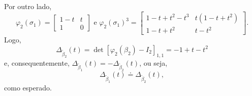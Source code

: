 	Por outro lado,
	\begin{equation*}
    	\varphi_2(\sigma_1) = \begin{bmatrix}
    	1-t & t \\
    	1 & 0
    	\end{bmatrix}\text{ e }\varphi_2(\sigma_1)^3 = \begin{bmatrix}
    	1-t+t^2-t^3 & t(1-t+t^2) \\
    	1-t+t^2 & t-t^2
    	\end{bmatrix}.
	\end{equation*}
	Logo,
	\begin{equation*}
	    \Delta_{\widetilde{\beta}_2}(t) = \det[\varphi_2(\beta_2) - I_2]_{1,1} = -1+t-t^2
	\end{equation*}
	e, consequentemente, $\Delta_{\widetilde{\beta}_1}(t) = -\Delta_{\widetilde{\beta}_2}(t)$, ou seja, 
	\begin{equation*}
	    \Delta_{\widetilde{\beta}_1}(t)\doteq\Delta_{\widetilde{\beta}_2}(t),
	\end{equation*}
	como esperado.
	
